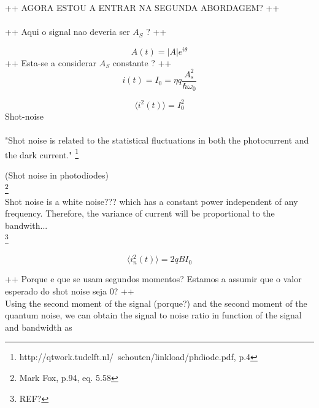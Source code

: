 \begin{bibunit}[plain]
++ AGORA ESTOU A ENTRAR NA SEGUNDA ABORDAGEM? ++\\
\\
++ Aqui o signal nao deveria ser $A_S$ ? ++

\begin{equation}
	A(t) = |A| e^{i \theta}
\end{equation}
++ Esta-se a considerar $A_S$ constante ? ++
\begin{equation}
	i(t) = I_0 = \eta q \frac{A_s^2}{\hbar \omega_0}
\end{equation}

\begin{equation}
	\langle i^2(t) \rangle = I_0^2
\end{equation}
Shot-noise\\
\\
"Shot noise is related to the statistical fluctuations in both the photocurrent and the dark current."
\footnote{http://qtwork.tudelft.nl/~schouten/linkload/phdiode.pdf, p.4}

(Shot noise in photodiodes)\\
\footnote{Mark Fox, p.94, eq. 5.58}
\\
Shot noise is a white noise??? which has a constant power independent of any frequency. Therefore, the variance of current will be proportional to the bandwith...\\
\footnote{REF?}

\begin{equation}
	\langle i_n^2(t) \rangle = 2 q B I_0
\end{equation}

++ Porque e que se usam segundos momentos? Estamos a assumir que o valor esperado do shot noise seja 0? ++
\\
Using the second moment of the signal (porque?) and the second moment of the quantum noise, we can obtain the signal to noise ratio in function of the signal and bandwidth as 



\end{bibunit}
